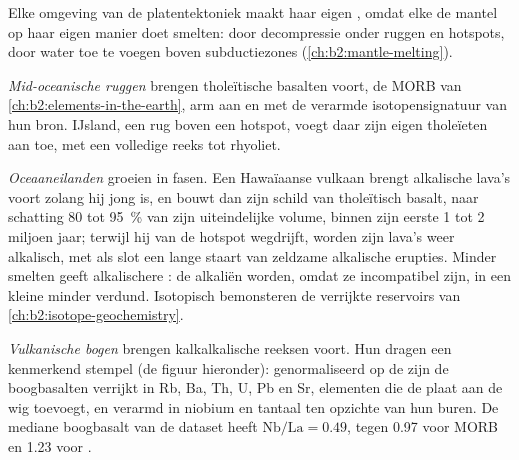 Elke omgeving van de platentektoniek maakt haar eigen , omdat elke de
mantel op haar eigen manier doet smelten: door decompressie onder ruggen en hotspots, door water toe te voegen
boven subductiezones (\cref{ch:b2:mantle-melting}).

\emph{Mid-oceanische ruggen} brengen tholeïtische basalten voort, de MORB van
\cref{ch:b2:elements-in-the-earth}, arm aan  en met de
verarmde isotopensignatuur van hun bron. IJsland, een rug boven een hotspot, voegt
daar zijn eigen tholeïeten aan toe, met een volledige reeks tot rhyoliet.

\emph{Oceaaneilanden} groeien in fasen. Een Hawaïaanse vulkaan brengt alkalische lava's voort zolang hij
jong is, en bouwt dan zijn schild van tholeïtisch basalt, naar schatting 80 tot
\qty{95}{\percent} van zijn uiteindelijke volume, binnen zijn eerste 1 tot 2 miljoen jaar; terwijl hij
van de hotspot wegdrijft, worden zijn lava's weer alkalisch, met als slot een lange staart van
zeldzame alkalische erupties. Minder smelten geeft alkalischere : de alkaliën worden, omdat ze
incompatibel zijn, in een kleine  minder verdund. Isotopisch bemonsteren
 de verrijkte reservoirs van \cref{ch:b2:isotope-geochemistry}.

\emph{Vulkanische bogen} brengen kalkalkalische reeksen voort. Hun  dragen een
kenmerkend stempel (de figuur hieronder): genormaliseerd op de  zijn de
boogbasalten verrijkt in Rb, Ba, Th, U, Pb en Sr, elementen die de plaat aan de
wig toevoegt, en verarmd in niobium en tantaal ten opzichte van hun buren. De mediane
boogbasalt van de dataset heeft $\mathrm{Nb}/\mathrm{La} = 0.49$, tegen 0.97 voor MORB
en 1.23 voor .

